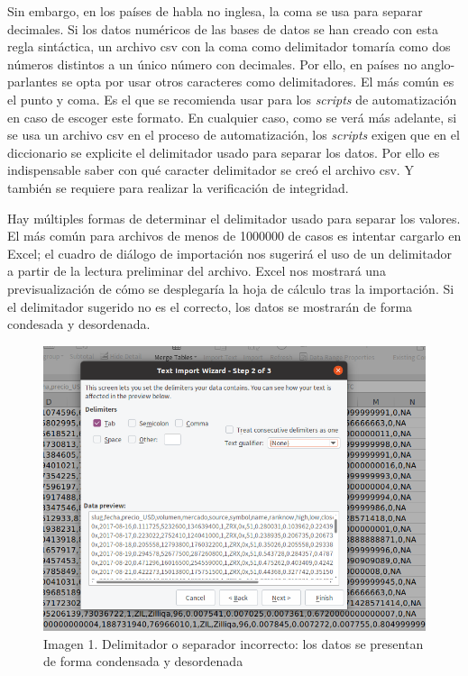 \documentclass[
  spanish,
]{book}
\begin{document}
Sin embargo, en los países de habla no inglesa, la coma se usa para separar decimales. Si los datos numéricos de las bases de datos se han creado con esta regla sintáctica, un archivo csv con la coma como delimitador tomaría como dos números distintos a un único número con decimales. Por ello, en países no anglo-parlantes se opta por usar otros caracteres como delimitadores. El más común es el punto y coma. Es el que se recomienda usar para los \emph{scripts} de automatización en caso de escoger este formato. En cualquier caso, como se verá más adelante, si se usa un archivo csv en el proceso de automatización, los \emph{scripts} exigen que en el diccionario se explicite el delimitador usado para separar los datos. Por ello es indispensable saber con qué caracter delimitador se creó el archivo csv. Y también se requiere para realizar la verificación de integridad.

Hay múltiples formas de determinar el delimitador usado para separar los valores. El más común para archivos de menos de 1000000 de casos es intentar cargarlo en Excel; el cuadro de diálogo de importación nos sugerirá el uso de un delimitador a partir de la lectura preliminar del archivo. Excel nos mostrará una previsualización de cómo se desplegaría la hoja de cálculo tras la importación. Si el delimitador sugerido no es el correcto, los datos se mostrarán de forma condesada y desordenada.

\begin{figure}
\centering
\includegraphics{imagenes/delimitador_incorrecto.png}
\caption{Imagen 1. Delimitador o separador incorrecto: los datos se presentan de forma condensada y desordenada}
\end{figure}
\end{document}
